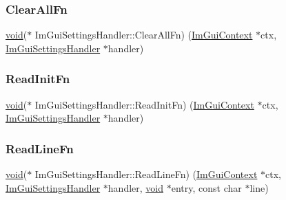 \mbox{\label{structImGuiSettingsHandler_a36355b915f61f94d90ba3f819fa02df0}} 
\subsubsection{\texorpdfstring{Clear\+All\+Fn}{ClearAllFn}}
{\footnotesize\ttfamily \hyperlink{imgui__impl__opengl3__loader_8h_ac668e7cffd9e2e9cfee428b9b2f34fa7}{void}($\ast$ Im\+Gui\+Settings\+Handler\+::\+Clear\+All\+Fn) (\hyperlink{structImGuiContext}{Im\+Gui\+Context} $\ast$ctx, \hyperlink{structImGuiSettingsHandler}{Im\+Gui\+Settings\+Handler} $\ast$handler)}

\mbox{\label{structImGuiSettingsHandler_a27706c3cad4a51af70dc2ebc5d3737d4}} 
\subsubsection{\texorpdfstring{Read\+Init\+Fn}{ReadInitFn}}
{\footnotesize\ttfamily \hyperlink{imgui__impl__opengl3__loader_8h_ac668e7cffd9e2e9cfee428b9b2f34fa7}{void}($\ast$ Im\+Gui\+Settings\+Handler\+::\+Read\+Init\+Fn) (\hyperlink{structImGuiContext}{Im\+Gui\+Context} $\ast$ctx, \hyperlink{structImGuiSettingsHandler}{Im\+Gui\+Settings\+Handler} $\ast$handler)}

\mbox{\label{structImGuiSettingsHandler_a0a02bad8569c2d9f22e1a532d1e2de60}} 
\subsubsection{\texorpdfstring{Read\+Line\+Fn}{ReadLineFn}}
{\footnotesize\ttfamily \hyperlink{imgui__impl__opengl3__loader_8h_ac668e7cffd9e2e9cfee428b9b2f34fa7}{void}($\ast$ Im\+Gui\+Settings\+Handler\+::\+Read\+Line\+Fn) (\hyperlink{structImGuiContext}{Im\+Gui\+Context} $\ast$ctx, \hyperlink{structImGuiSettingsHandler}{Im\+Gui\+Settings\+Handler} $\ast$handler, \hyperlink{imgui__impl__opengl3__loader_8h_ac668e7cffd9e2e9cfee428b9b2f34fa7}{void} $\ast$entry, const char $\ast$line)}

